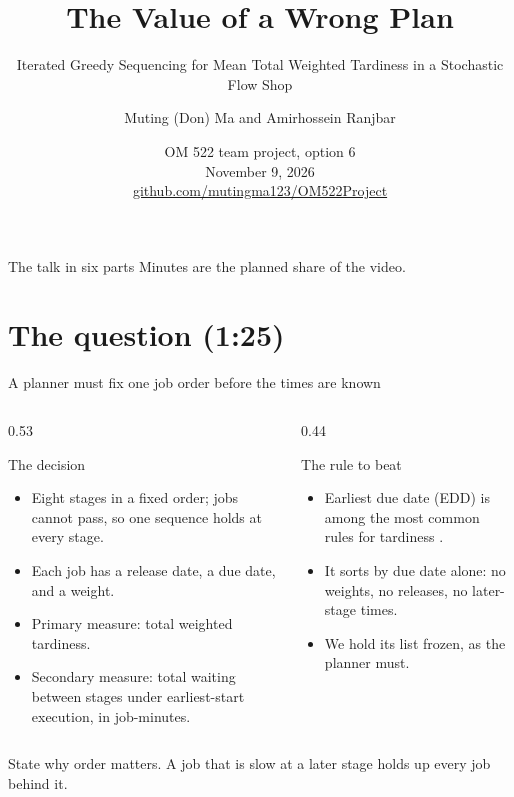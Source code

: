 \documentclass[aspectratio=169,11pt]{beamer}
\title{The Value of a Wrong Plan}
\subtitle{Iterated Greedy Sequencing for Mean Total Weighted Tardiness in a Stochastic Flow Shop}
\author{Muting (Don) Ma and Amirhossein Ranjbar}
\date{OM 522 team project, option 6\\[0.3em] November 9, 2026\\[0.3em] \href{https://github.com/mutingma123/OM522Project}{github.com/mutingma123/OM522Project}}
\renewcommand{\fine}{\unskip\space}
\newcommand{\point}[2]{\par\medskip\sumpara #1\sumparaend
  {\color{uablue}\fin #2\fine}\par}
\begin{document}
\begin{frame}[plain]
\titlepage
\end{frame}

\begin{frame}{The talk in six parts}
\tableofcontents[hideallsubsections,sections={1-6}]
\vfill
{\scriptsize\color{muted}Minutes are the planned share of the video.}
\end{frame}

\section{The question (1:25)}\label{sec:question}
\begin{frame}{A planner must fix one job order before the times are known}
\begin{columns}[T,onlytextwidth]
\begin{column}{0.53\textwidth}
\begin{block}{The decision}
\small
\begin{itemize}
\item Eight stages in a fixed order; jobs cannot pass, so one sequence holds at every stage.
\item Each job has a release date, a due date, and a weight.
\item Primary measure: total weighted tardiness.
\item Secondary measure: total waiting between stages under earliest-start execution, in job-minutes.
\end{itemize}
\end{block}
\end{column}
\begin{column}{0.44\textwidth}
\begin{block}{The rule to beat}
\small
\begin{itemize}
\item Earliest due date (EDD) is among the most common rules for tardiness \cite{vallada2008review}.
\item It sorts by due date alone: no weights, no releases, no later-stage times.
\item We hold its list frozen, as the planner must.
\end{itemize}
\end{block}
\end{column}
\end{columns}
\point{State why order matters.}{A job that is slow at a later stage holds up every job behind it.}
\end{frame}
\end{document}
